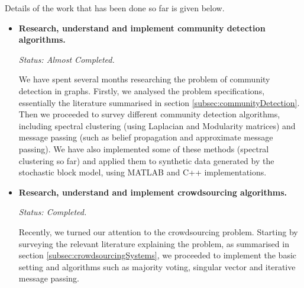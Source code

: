 \documentclass[12pt]{article}
\numberwithin{equation}{section}
\begin{document}
Details of the work that has been done so far is given below.
\begin{itemize}
	\item \textbf{Research, understand and implement community detection algorithms.}

	\textit{Status: Almost Completed.}	

	We have spent several months researching the problem of community detection in graphs. Firstly, we analysed the problem specifications, essentially the literature summarised in section \ref{subsec:communityDetection}. Then we proceeded to survey different community detection algorithms, including spectral clustering (using Laplacian and Modularity matrices) and message passing (such as belief propagation and approximate message passing). We have also implemented some of these methods (spectral clustering so far) and applied them to synthetic data generated by the stochastic block model, using MATLAB and C++ implementations.

	\item \textbf{Research, understand and implement crowdsourcing algorithms.}

	\textit{Status: Completed.}

	Recently, we turned our attention to the crowdsourcing problem. Starting by surveying the relevant literature explaining the problem, as summarised in section \ref{subsec:crowdsourcingSystems}, we proceeded to implement the basic setting and algorithms such as majority voting, singular vector and iterative message passing.
\end{itemize}
\end{document}
